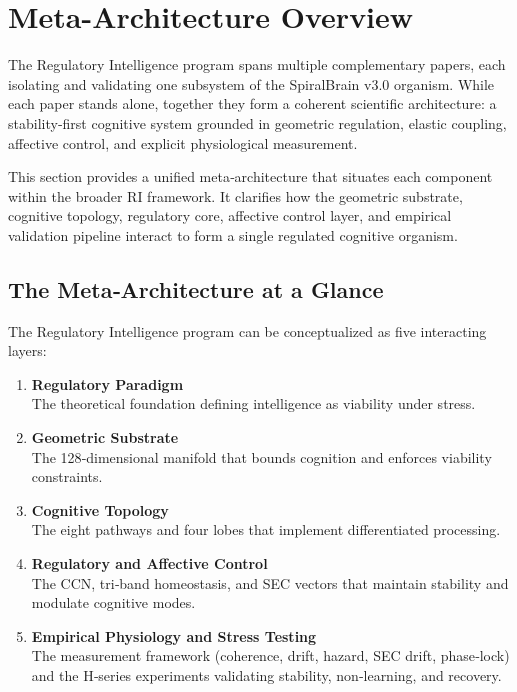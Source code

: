 \documentclass[12pt,a4paper]{report}
\begin{document}
\section{Meta-Architecture Overview}

The Regulatory Intelligence program spans multiple complementary papers, each isolating and validating one subsystem of the SpiralBrain v3.0 \cite{SpiralBrainV3} organism. While each paper stands alone, together they form a coherent scientific architecture: a stability‑first cognitive system grounded in geometric regulation, elastic coupling, affective control, and explicit physiological measurement.

This section provides a unified meta‑architecture that situates each component within the broader RI framework. It clarifies how the geometric substrate, cognitive topology, regulatory core, affective control layer, and empirical validation pipeline interact to form a single regulated cognitive organism.

\subsection{The Meta‑Architecture at a Glance}

The Regulatory Intelligence program can be conceptualized as five interacting layers:

\begin{enumerate}
\item \textbf{Regulatory Paradigm} \\
  The theoretical foundation defining intelligence as viability under stress.

\item \textbf{Geometric Substrate} \\
  The 128‑dimensional manifold that bounds cognition and enforces viability constraints.

\item \textbf{Cognitive Topology} \\
  The eight pathways and four lobes that implement differentiated processing.

\item \textbf{Regulatory and Affective Control} \\
  The CCN, tri‑band homeostasis, and SEC vectors that maintain stability and modulate cognitive modes.

\item \textbf{Empirical Physiology and Stress Testing} \\
  The measurement framework (coherence, drift, hazard, SEC drift, phase‑lock) and the H‑series experiments validating stability, non‑learning, and recovery.
\end{enumerate}
\end{document}
